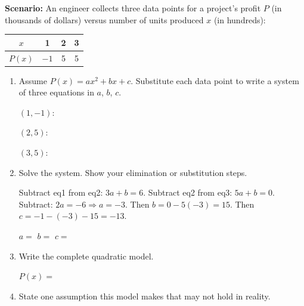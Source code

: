 \documentclass[10pt]{article}
\begin{document}
\vspace{0.08in}

\begin{tcolorbox}[colback=white, colframe=black!40,
    title=\textbf{Tier E --- Extend},
    fonttitle=\bfseries, arc=2mm, left=3mm, right=3mm, top=2mm, bottom=2mm]

\textbf{Scenario:} An engineer collects three data points for a project's profit $P$
(in thousands of dollars) versus number of units produced $x$ (in hundreds):

\medskip
\renewcommand{\arraystretch}{1.3}
\begin{tabular}{|c|c|c|c|}
\hline
$x$ & 1 & 2 & 3 \\
\hline
$P(x)$ & $-1$ & 5 & 5 \\
\hline
\end{tabular}

\begin{enumerate}[itemsep=10pt]
  \item Assume $P(x) = ax^2 + bx + c$. Substitute each data point to write a system
        of three equations in $a$, $b$, $c$.

        \vspace{0.06in}
        $(1,-1)$: 

        \vspace{0.04in}
        $(2, 5)$: 

        \vspace{0.04in}
        $(3, 5)$: 

  \item Solve the system. Show your elimination or substitution steps.

        \vspace{0.08in}
        \begin{teachernote}
        Subtract eq1 from eq2: $3a + b = 6$. Subtract eq2 from eq3: $5a + b = 0$.
        Subtract: $2a = -6 \Rightarrow a = -3$. Then $b = 0 - 5(-3) = 15$. Then $c = -1 - (-3) - 15 = -13$.
        \end{teachernote}

        $a = $  \quad $b = $  \quad $c = $ 

  \item Write the complete quadratic model.

        \vspace{0.06in}
        $P(x) = $ 

  \item State one assumption this model makes that may not hold in reality.


\end{enumerate}
\end{tcolorbox}
\end{document}
